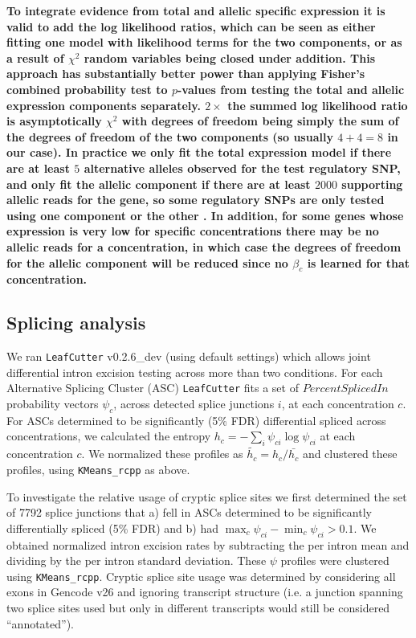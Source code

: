 \documentclass{article}
\newcommand{\tempbold}[1]{\textbf{#1}}
\begin{document}
\tempbold{To integrate evidence from total and allelic specific expression it is valid to add the log likelihood ratios, which can be seen as either fitting one model with likelihood terms for the two components, or as a result of $\chi^2$ random variables being closed under addition. This approach has substantially better power than applying Fisher's combined probability test to $p$-values from testing the total and allelic expression components separately.  $2\times$ the summed log likelihood ratio is asymptotically $\chi^2$  with degrees of freedom being simply the sum of the degrees of freedom of the two components (so usually $4+4=8$ in our case). In practice we only fit the total expression model if there are at least $5$ alternative alleles observed for the test regulatory SNP, and only fit the allelic component if there are at least $2000$ supporting allelic reads for the gene, so some regulatory SNPs are only tested using one component or the other . In addition, for some genes whose expression is very low for specific concentrations there may be no allelic reads for a concentration, in which case the degrees of freedom for the allelic component will be reduced since no $\beta_c$ is learned for that concentration.}

\subsection*{Splicing analysis}

We ran \texttt{LeafCutter} v0.2.6\_dev (using default settings) which allows joint differential intron excision testing across more than two conditions. For each Alternative Splicing Cluster (ASC) \texttt{LeafCutter} fits a set of $Percent Spliced In$ probability vectors $\psi_{c}$, across detected splice junctions $i$, at each concentration $c$. For ASCs determined to be significantly (5\% FDR) differential spliced across concentrations, we calculated the entropy $h_c = -\sum_i \psi_{ci} \log \psi_{ci}$ at each concentration $c$. We normalized these profiles as $\tilde{h_c} = h_c / \bar{h_c}$ and clustered these profiles, using \texttt{KMeans\_rcpp} as above. 

To investigate the relative usage of cryptic splice sites we first determined the set of 7792 splice junctions that a) fell in ASCs determined to be significantly differentially spliced (5\% FDR) and b) had $\max_c \psi_{ci} - \min_c \psi_{ci} > 0.1$. We obtained normalized intron excision rates by subtracting the per intron mean and dividing by the per intron standard deviation. These $\psi$ profiles were clustered using \texttt{KMeans\_rcpp}. Cryptic splice site usage was determined by considering all exons in Gencode v26 and ignoring transcript structure (i.e. a junction spanning two splice sites used but only in different transcripts would still be considered ``annotated''). 
\end{document}
